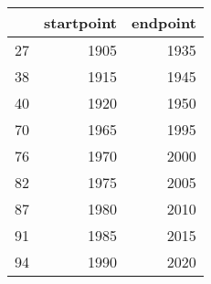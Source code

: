 % 
\begin{tabular}{rrr}
  \hline
 & startpoint & endpoint \\ 
  \hline
27 & 1905 & 1935 \\ 
  38 & 1915 & 1945 \\ 
  40 & 1920 & 1950 \\ 
  70 & 1965 & 1995 \\ 
  76 & 1970 & 2000 \\ 
  82 & 1975 & 2005 \\ 
  87 & 1980 & 2010 \\ 
  91 & 1985 & 2015 \\ 
  94 & 1990 & 2020 \\ 
   \hline
\end{tabular}
